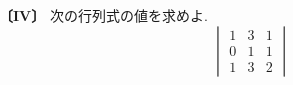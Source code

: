 \noindent\textbf{〔IV〕}
次の行列式の値を求めよ.
\[
\begin{vmatrix}
1 & 3 & 1\\
0 & 1 & 1\\
1 & 3 & 2
\end{vmatrix}
\]
